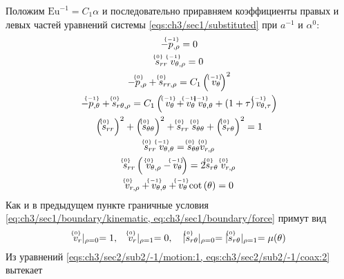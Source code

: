 Положим $\text{Eu}^{-1} = C_1 \alpha$ и последовательно приравняем коэффициенты правых и левых частей уравнений системы \cref{eqs:ch3/sec1/substituted} при $a^{-1}$ и $\alpha^0$:
\begin{subequations}
  \label{eqs:ch3/sec2/sub2/main}
  \begin{gather}
    \label{eqs:ch3/sec2/sub2/-1/motion:1}
    -\uindex{p}{-1}_{,\rho} = 0
    \\
    \label{eqs:ch3/sec2/sub2/-1/coax:2}
    \uindex{s}{0}_{rr} \; \uindex{v}{-1}_{\theta,\rho} = 0
    \\
    \label{eqs:ch3/sec2/sub2/0/motion:1}
    -\uindex{p}{0}_{,\rho} + \uindex{s}{0}_{rr,\rho} = C_1 \left(\ \uindex{v}{-1}_{\theta}\right)^2
    \\
    \label{eqs:ch3/sec2/sub2/0/motion:2}
    -\uindex{p}{-1}_{,\theta} + \uindex{s}{0}_{r\theta,\rho} = C_1 \left(\ \uindex{v}{-1}_{\theta} + \uindex{v}{-1}_{\theta} \; \uindex{v}{-1}_{\theta,\theta} +
     \left(1+\tau\right) \uindex{v}{-1}_{\theta,\tau}\right)
    \\
    \label{eqs:ch3/sec2/sub2/0/plasticity}
    \left(\uindex{s}{0}_{rr}\right)^2 + \left(\uindex{s}{0}_{\theta\theta}\right)^2 + \uindex{s}{0}_{rr}\; \uindex{s}{0}_{\theta\theta} + \left(\uindex{s}{0}_{r\theta}\right)^2 = 1
    \\
    \label{eqs:ch3/sec2/sub2/0/coax:1}
    \uindex{s}{0}_{rr} \; \uindex{v}{-1}_{\theta,\theta} = \uindex{s}{0}_{\theta\theta} \uindex{v}{0}_{r,\rho}
    \\
    \label{eqs:ch3/sec2/sub2/0/coax:2}
    \uindex{s}{0}_{rr} \left(\ \uindex{v}{0}_{\theta,\rho} - \uindex{v}{-1}_{\theta}\right) = 2 \uindex{s}{0}_{r\theta} \; \uindex{v}{0}_{r,\rho}
    \\
    \label{eqs:ch3/sec2/sub2/0/uncompress}
    \uindex{v}{0}_{r,\rho} + \uindex{v}{-1}_{\theta,\theta} + \uindex{v}{-1}_{\theta} \cot{\left(\theta\right)} = 0
  \end{gather}
\end{subequations}
Как и в предыдущем пункте граничные условия \cref{eq:ch3/sec1/boundary/kinematic, eq:ch3/sec1/boundary/force} примут вид
\begin{equation}
  \label{eq:ch3/sec2/sub2/boundary/0}
  \uindex{v}{0}_{r}\lvert_{\rho=0} = 1, \quad \uindex{v}{0}_{r}\lvert_{\rho=1} = 0, \quad \lvert \uindex{s}{0}_{r\theta}\lvert_{\rho=0} = \lvert \uindex{s}{0}_{r\theta}\lvert_{\rho=1} = \mu(\theta)
\end{equation}
Из уравнений \cref{eqs:ch3/sec2/sub2/-1/motion:1, eqs:ch3/sec2/sub2/-1/coax:2} вытекает

